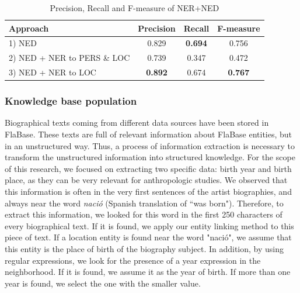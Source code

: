 \begin{table}
	\centering
	  \begin{tabular}{ | l | c | c | c | }
    \hline
    Approach & Precision & Recall & F-measure \\ \hline
    \hline
    1) NED & 0.829 & \textbf{0.694} & 0.756 \\ 
    2) NED + NER to PERS \& LOC & 0.739 & 0.347 & 0.472 \\
    3) NED + NER to LOC & \textbf{0.892} & 0.674 & \textbf{0.767} \\
    \hline
  \end{tabular}
	\caption{Precision, Recall and F-measure of NER+NED}
	
	\label{tbl:musicology:res1}
\end{table}

\subsubsection{Knowledge base population}\label{sec:musicology:ie}

Biographical texts coming from different data sources have been stored in FlaBase. These texts are full of relevant information about FlaBase entities, but in an unstructured way. Thus, a process of information extraction is necessary to transform the unstructured information into structured knowledge. For the scope of this research, we focused on extracting two specific data: birth year and birth place, as they can be very relevant for anthropologic studies. We observed that this information is often in the very first sentences of the artist biographies, and always near the word \textit{naci\'{o}} (Spanish translation of ``was born"). Therefore, to extract this information, we looked for this word in the first 250 characters of every biographical text. If it is found, we apply our entity linking method to this piece of text. If a location entity is found near the word "naci\'{o}", we assume that this entity is the place of birth of the biography subject. In addition, by using regular expressions, we look for the presence of a year expression in the neighborhood. If it is found, we assume it as the year of birth. If more than one year is found, we select the one with the smaller value. 

